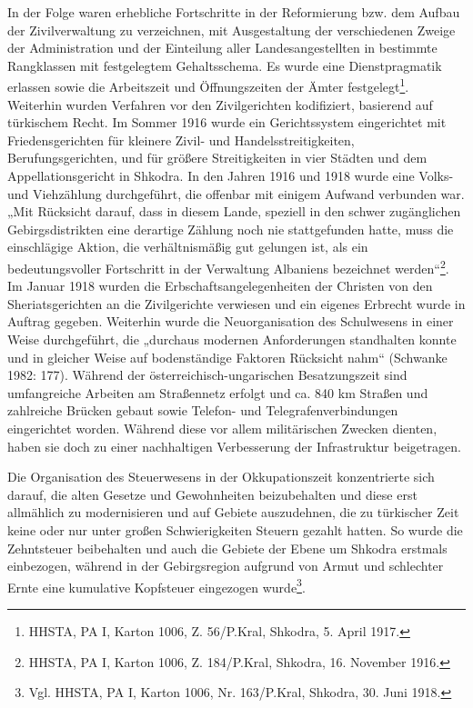 In der Folge waren erhebliche Fortschritte in der Reformierung bzw. dem Aufbau der Zivilverwaltung zu verzeichnen, mit Ausgestaltung der verschiedenen Zweige der Administration und der Einteilung aller Landesangestellten in bestimmte Rangklassen mit festgelegtem Gehaltsschema. Es wurde eine Dienstpragmatik erlassen sowie die Arbeitszeit und Öffnungszeiten der Ämter festgelegt\footnote{HHSTA, PA I, Karton 1006, Z. 56/P.Kral, Shkodra, 5. April 1917. }. Weiterhin wurden Verfahren vor den Zivilgerichten kodifiziert, basierend auf türkischem Recht. Im Sommer 1916 wurde ein Gerichtssystem eingerichtet mit Friedensgerichten für kleinere Zivil- und Handelsstreitigkeiten, Berufungsgerichten, und für größere Streitigkeiten in vier Städten und dem Appellationsgericht in Shkodra. In den Jahren 1916 und 1918 wurde eine Volks- und Viehzählung durchgeführt, die offenbar mit einigem Aufwand verbunden war. „Mit Rücksicht darauf, dass in diesem Lande, speziell in den schwer zugänglichen Gebirgsdistrikten eine derartige Zählung noch nie stattgefunden hatte, muss die einschlägige Aktion, die verhältnismäßig gut gelungen ist, als ein bedeutungsvoller Fortschritt in der Verwaltung Albaniens bezeichnet werden“\footnote{HHSTA, PA I, Karton 1006, Z. 184/P.Kral, Shkodra, 16. November 1916.}. Im Januar 1918 wurden die Erbschaftsangelegenheiten der Christen von den Sheriatsgerichten an die Zivilgerichte verwiesen und ein eigenes Erbrecht wurde in Auftrag gegeben. Weiterhin wurde die Neuorganisation des Schulwesens in einer Weise durchgeführt, die „durchaus modernen Anforderungen standhalten konnte und in gleicher Weise auf bodenständige Faktoren Rücksicht nahm“ (Schwanke 1982: 177). Während der österreichisch-ungarischen Besatzungszeit sind umfangreiche Arbeiten am Straßennetz erfolgt und ca. 840 km Straßen und zahlreiche Brücken gebaut sowie Telefon- und Telegrafenverbindungen eingerichtet worden. Während diese vor allem militärischen Zwecken dienten, haben sie doch zu einer nachhaltigen Verbesserung der Infrastruktur beigetragen.\par
Die Organisation des Steuerwesens in der Okkupationszeit konzentrierte sich darauf, die alten Gesetze und Gewohnheiten beizubehalten und diese erst allmählich zu modernisieren und auf Gebiete auszudehnen, die zu türkischer Zeit keine oder nur unter großen Schwierigkeiten Steuern gezahlt hatten. So wurde die Zehntsteuer beibehalten und auch die Gebiete der Ebene um Shkodra erstmals einbezogen, während in der Gebirgsregion aufgrund von Armut und schlechter Ernte eine kumulative Kopfsteuer eingezogen wurde\footnote{Vgl. HHSTA, PA I, Karton 1006, Nr. 163/P.Kral, Shkodra, 30. Juni 1918.}.\par
